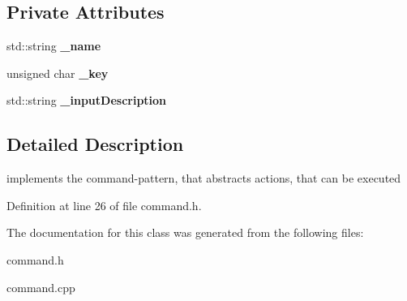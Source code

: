 \subsection*{Private Attributes}
\begin{DoxyCompactItemize}
\item 
std\-::string {\bfseries \-\_\-name}\label{classsfs__visualizer_1_1Command_a11380d564fe5f57be44a65a4b7c86ad7}

\item 
unsigned char {\bfseries \-\_\-key}\label{classsfs__visualizer_1_1Command_a47117c28736e509c1c6a8744b9e4f1bd}

\item 
std\-::string {\bfseries \-\_\-input\-Description}\label{classsfs__visualizer_1_1Command_afe2999f3f0368ad50d5052156d90ec68}

\end{DoxyCompactItemize}


\subsection{Detailed Description}
implements the command-\/pattern, that abstracts actions, that can be executed 

Definition at line 26 of file command.\-h.



The documentation for this class was generated from the following files\-:\begin{DoxyCompactItemize}
\item 
command.\-h\item 
command.\-cpp\end{DoxyCompactItemize}
